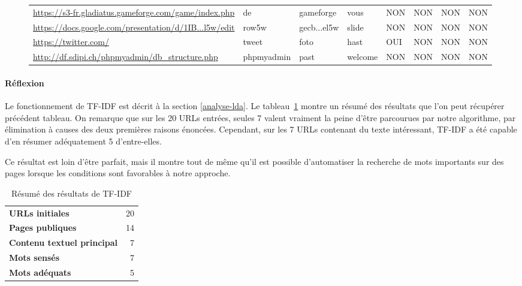 \begin{figure}
\begin{tabular}{llllllll}
\scriptsize \url{https://s3-fr.gladiatus.gameforge.com/game/index.php}  & de              & gameforge                & vous           & \cellcolor[HTML]{FFCCC9}NON & \cellcolor[HTML]{FFCCC9}NON & \cellcolor[HTML]{FFCCC9}NON & \cellcolor[HTML]{FFCCC9}NON \\
\scriptsize \url{https://docs.google.com/presentation/d/1IB...l5w/edit} & row5w           & gecb...el5w & slide          & \cellcolor[HTML]{FFCCC9}NON & \cellcolor[HTML]{FFCCC9}NON & \cellcolor[HTML]{FFCCC9}NON & \cellcolor[HTML]{FFCCC9}NON \\
\scriptsize \url{https://twitter.com/}                                  & tweet           & foto                     & hast           & \cellcolor[HTML]{9AFF99}OUI & \cellcolor[HTML]{FFCCC9}NON & \cellcolor[HTML]{FFCCC9}NON & \cellcolor[HTML]{FFCCC9}NON \\
\scriptsize \url{http://df.sdipi.ch/phpmyadmin/db\_structure.php}       & phpmyadmin      & past                     & welcome        & \cellcolor[HTML]{FFCCC9}NON & \cellcolor[HTML]{FFCCC9}NON & \cellcolor[HTML]{FFCCC9}NON & \cellcolor[HTML]{FFCCC9}NON \\ \hline
\end{tabular}
\end{figure}

			\paragraph{Réflexion}

				Le fonctionnement de TF-IDF est décrit à la section \ref{analyse-lda}. Le tableau~\ref{resultats-tfidf} montre un résumé des résultats que l'on peut récupérer précédent tableau. On remarque que sur les 20 URLs entrées, seules 7 valent vraiment la peine d'être parcourues par notre algorithme, par élimination à causes des deux premières raisons énoncées. Cependant, sur les 7 URLs contenant du texte intéressant, TF-IDF a été capable d'en résumer adéquatement 5 d'entre-elles.

				Ce résultat est loin d'être parfait, mais il montre tout de même qu'il est possible d'automatiser la recherche de mots importants sur des pages lorsque les conditions sont favorables à notre approche.

\FloatBarrier

				\begin{table}[h]
\centering
\caption{Résumé des résultats de TF-IDF}
\label{resultats-tfidf}
\begin{tabular}{lr}
\textbf{URLs initiales}            & 20 \\
\textbf{Pages publiques}           & 14 \\
\textbf{Contenu textuel principal} & 7  \\
\textbf{Mots sensés}               & 7  \\
\textbf{Mots adéquats}             & 5 
\end{tabular}
\end{table}


